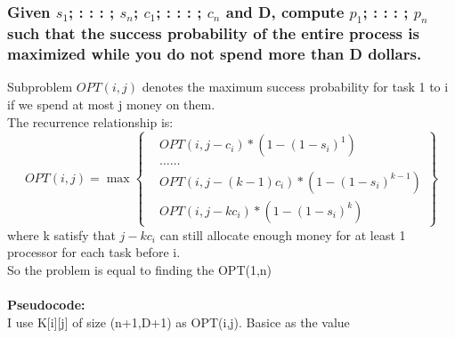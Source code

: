 \documentclass{article}
\begin{document}
\subsubsection{Given $s_1$; : : : ; $s_n$; $c_1$; : : : ; $c_n$ and D, compute $p_1$; : : : ; $p_n$ such that the success probability of the entire process is maximized while you do not spend more than D dollars.}Subproblem $OPT(i,j)$ denotes the maximum success probability for task 1 to i if we spend at most j money on them.\\
The recurrence relationship is: 
$$ OPT(i,j)=\max \left\{
\begin{aligned}
& OPT(i,j-c_i)*(1-(1-s_i)^{1}) \\
& \dots \dots\\
& OPT(i,j-(k-1)c_i)*(1-(1-s_i)^{k-1}) \\
& OPT(i,j-kc_i)*(1-(1-s_i)^{k})
\end{aligned}
\right\}
$$
where k satisfy that $j-kc_i$ can still allocate enough money for at least 1 processor for each task before i.\\
So the problem is equal to finding the OPT(1,n)\\\\
\textbf{\large Pseudocode:\\}
I use K[i][j] of size (n+1,D+1) as OPT(i,j).
Basice as the value 
\end{document}
